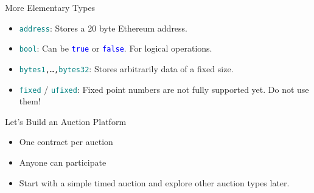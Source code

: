 \documentclass[handout]{beamer}
\begin{document}
\begin{frame}{More Elementary Types}

	\begin{itemize}
		\item<1-> \texttt{\textcolor{teal}{address}}: Stores a 20 byte Ethereum address.
		\item<1-> \texttt{\textcolor{teal}{bool}}: Can be \texttt{\textcolor{blue}{true}} or \texttt{\textcolor{blue}{false}}. For logical operations.
		\item<1-> \texttt{\textcolor{teal}{bytes1},\dots,\textcolor{teal}{bytes32}}: Stores arbitrarily data of a fixed size.
		\item<1-> \texttt{\textcolor{teal}{fixed}} / \texttt{\textcolor{teal}{ufixed}}: Fixed point numbers are not fully supported yet. Do not use them!
	\end{itemize}
	
	\vspace{1em}
	
	
\end{frame}

\begin{frame}{Let's Build an Auction Platform}

	\begin{itemize}
		\item<1-> One contract per auction
		\item<1-> Anyone can participate
		\item<1-> Start with a simple timed auction and explore other auction types later.
	\end{itemize}
	
	
\end{frame}
\end{document}

